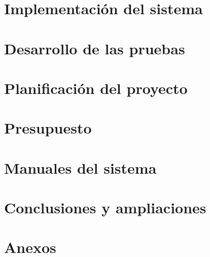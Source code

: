 \documentclass{report}
\begin{document}
\chapter{Implementación del sistema}
\label{chapter:implementacion}


\chapter{Desarrollo de las pruebas}
\label{chapter:desarrollo_pruebas}


\chapter{Planificación del proyecto}
\label{chapter:planificacion}


\chapter{Presupuesto}
\label{chapter:presupuesto}


\chapter{Manuales del sistema}
\label{chapter08}


\chapter{Conclusiones y ampliaciones}
\label{chapter:conclusiones_ampliaciones}


\chapter{Anexos}
\label{anexos}


\printbibliography
\end{document}

